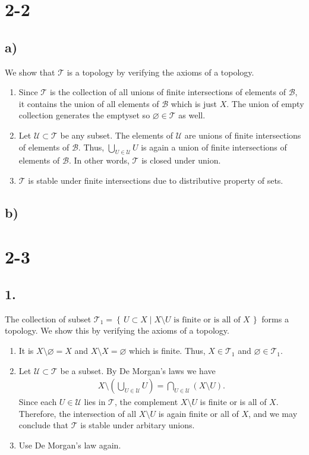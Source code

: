 \documentclass[a4paper]{book}
\theoremstyle{definition}
\newcommand{\makeset}[2]{\left\{\, #1 \mid #2 \,\right\}}
\begin{document}
\section*{2-2}
\subsection*{a)}
We show that \(\mathcal{T}\) is a topology by verifying the axioms of a topology.
\begin{enumerate}
    \item Since \(\mathcal{T}\) is the collection of all unions of finite intersections of elements of \(\mathcal{B}\), it contains the union of all elements of \(\mathcal{B}\) which is just \(X\). The union of empty collection generates the emptyset so \(\varnothing \in \mathcal{T}\) as well.
    \item Let \(\mathcal{U} \subset \mathcal{T}\) be any subset. The elements of \(\mathcal{U}\) are unions of finite intersections of elements of \(\mathcal{B}\). Thus, \(\bigcup_{U \in \mathcal{U}} U\) is again a union of finite intersections of elements of \(\mathcal{B}\). In other words, \(\mathcal{T}\) is closed under union.
    \item \(\mathcal{T}\) is stable under finite intersections due to distributive property of sets.
\end{enumerate}

\subsection*{b)}

\section*{2-3}
\subsection*{1.}
The collection of subset \(\mathcal{T}_1 = \makeset{U \subset X}{X \setminus U \text{ is finite or is all of } X}\) forms a topology. We show this by verifying the axioms of a topology.
\begin{enumerate}
    \item It is \(X \setminus \varnothing = X\) and \(X \setminus X = \varnothing\) which is finite. Thus, \(X \in \mathcal{T}_1\) and \(\varnothing \in \mathcal{T}_1\).
    \item Let \(\mathcal{U} \subset \mathcal{T}\) be a subset. By De Morgan's laws we have
    \begin{align*}
        X \setminus \left(\bigcup_{U \in \mathcal{U}} U \right) = \bigcap_{U \in \mathcal{U}} \left( X \setminus U \right) \text{.}
    \end{align*}
    Since each \(U \in \mathcal{U}\) lies in \(\mathcal{T}\), the complement \(X \setminus U\) is finite or is all of \(X\). Therefore, the intersection of all \(X \setminus U\) is again finite or all of \(X\), and we may conclude that \(\mathcal{T}\) is stable under arbitary unions.
    \item Use De Morgan's law again.
\end{enumerate}
\end{document}
